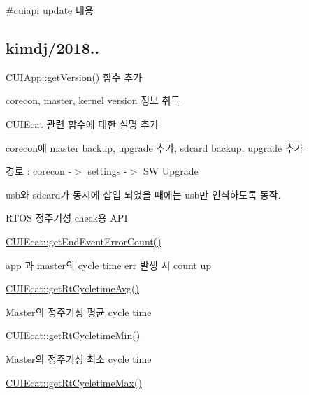 \#cuiapi update 내용

\subsection*{kimdj/2018..}


\begin{DoxyEnumerate}
\item \hyperlink{classCUIApp_a50b55afe3b66bc00cb1e2e34ed8db2b0}{C\-U\-I\-App\-::get\-Version()} 함수 추가
\begin{DoxyItemize}
\item corecon, master, kernel version 정보 취득
\end{DoxyItemize}
\item \hyperlink{classCUIEcat}{C\-U\-I\-Ecat} 관련 함수에 대한 설명 추가
\item corecon에 master backup, upgrade 추가, sdcard backup, upgrade 추가
\begin{DoxyItemize}
\item 경로 \-: corecon -\/$>$ settings -\/$>$ S\-W Upgrade
\item usb와 sdcard가 동시에 삽입 되었을 때에는 usb만 인식하도록 동작.
\end{DoxyItemize}
\item R\-T\-O\-S 정주기성 check용 A\-P\-I
\begin{DoxyItemize}
\item \hyperlink{classCUIEcat_a49fba779055b9959e804b3d6587f9799}{C\-U\-I\-Ecat\-::get\-End\-Event\-Error\-Count()}
\begin{DoxyItemize}
\item app 과 master의 cycle time err 발생 시 count up
\end{DoxyItemize}
\item \hyperlink{classCUIEcat_ab62988589c529181b1b9716910d6e66a}{C\-U\-I\-Ecat\-::get\-Rt\-Cycletime\-Avg()}
\begin{DoxyItemize}
\item Master의 정주기성 평균 cycle time
\end{DoxyItemize}
\item \hyperlink{classCUIEcat_aee10d1bfa0042f7f7eed3fb799353643}{C\-U\-I\-Ecat\-::get\-Rt\-Cycletime\-Min()}
\begin{DoxyItemize}
\item Master의 정주기성 최소 cycle time
\end{DoxyItemize}
\item \hyperlink{classCUIEcat_af6d43ab5430d66093cec76234055baa7}{C\-U\-I\-Ecat\-::get\-Rt\-Cycletime\-Max()}

\end{DoxyItemize}
\end{DoxyEnumerate}
